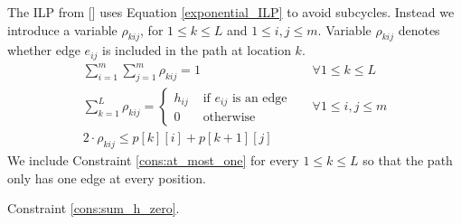 \documentclass[acmsmall,natbib=false]{acmart}
\begin{document}
The ILP from [] uses Equation \ref{exponential_ILP} to avoid subcycles. Instead we introduce a variable $\rho_{kij}$, for $1 \leq k \leq L$ and $1 \leq i, j \leq m$. Variable $\rho_{kij}$ denotes whether edge $e_{ij}$ is included in the path at location $k$.
\begin{align}
  \sum_{i=1}^m \sum_{j=1}^m \rho_{kij} = 1 &&\forall 1 \leq k \leq L \label{cons:at_most_one}\\
  \sum_{k=1}^L \rho_{kij} = \begin{cases} h_{ij} &\text{ if } e_{ij} \text{ is an edge} \\
    0 &\text{ otherwise}
  \end{cases} && \forall 1 \leq i, j \leq m \label{cons:sum_h_zero}\\
  2 \cdot \rho_{kij} \leq p[k][i] + p[k+1][j]
\end{align}
We include Constraint \ref{cons:at_most_one} for every $1 \leq k \leq L$ so that the path only has one edge at every position.

Constraint \ref{cons:sum_h_zero}.




\end{document}
